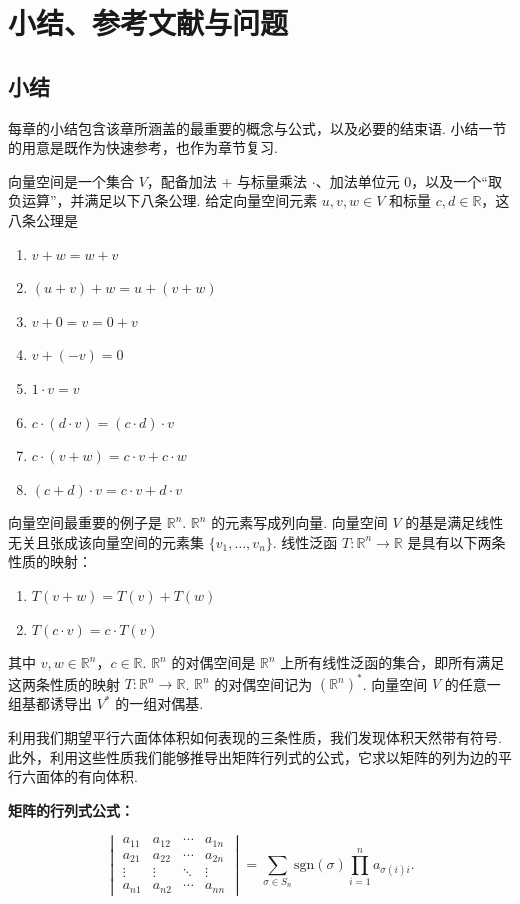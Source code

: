 \section{小结、参考文献与问题}

\subsection{小结}

每章的小结包含该章所涵盖的最重要的概念与公式，以及必要的结束语. 小结一节的用意是既作为快速参考，也作为章节复习.

向量空间是一个集合 $V$，配备加法 $+$ 与标量乘法 $\cdot$、加法单位元 $0$，以及一个``取负运算''，并满足以下八条公理. 给定向量空间元素 $u,v,w\in V$ 和标量 $c,d\in\mathbb{R}$，这八条公理是
\begin{enumerate}
  \item $v+w=w+v$
  \item $(u+v)+w=u+(v+w)$
  \item $v+0=v=0+v$
  \item $v+(-v)=0$
  \item $1\cdot v=v$
  \item $c\cdot(d\cdot v)=(c\cdot d)\cdot v$
  \item $c\cdot(v+w)=c\cdot v+c\cdot w$
  \item $(c+d)\cdot v=c\cdot v+d\cdot v
  $
\end{enumerate}
向量空间最重要的例子是 $\mathbb{R}^n$. $\mathbb{R}^n$ 的元素写成列向量. 向量空间 $V$ 的基是满足线性无关且张成该向量空间的元素集 $\{v_1,\ldots,v_n\}$. 线性泛函 $T:\mathbb{R}^n\to\mathbb{R}$ 是具有以下两条性质的映射：
\begin{enumerate}
  \item $T(v+w)=T(v)+T(w)$
  \item $T(c\cdot v)=c\cdot T(v)$
\end{enumerate}
其中 $v,w\in\mathbb{R}^n$，$c\in\mathbb{R}$. $\mathbb{R}^n$ 的对偶空间是 $\mathbb{R}^n$ 上所有线性泛函的集合，即所有满足这两条性质的映射 $T:\mathbb{R}^n\to\mathbb{R}$. $\mathbb{R}^n$ 的对偶空间记为 $(\mathbb{R}^n)^*$. 向量空间 $V$ 的任意一组基都诱导出 $V^*$ 的一组对偶基.

利用我们期望平行六面体体积如何表现的三条性质，我们发现体积天然带有符号. 此外，利用这些性质我们能够推导出矩阵行列式的公式，它求以矩阵的列为边的平行六面体的有向体积.

\begin{center}
\textbf{矩阵的行列式公式：}
\end{center}
\[
\begin{vmatrix}a_{11}&a_{12}&\cdots&a_{1n}\\a_{21}&a_{22}&\cdots&a_{2n}\\\vdots&\vdots&\ddots&\vdots\\a_{n1}&a_{n2}&\cdots&a_{nn}\end{vmatrix}
=\sum_{\sigma\in S_n}\mathrm{sgn}(\sigma)\prod_{i=1}^{n}a_{\sigma(i)i}.
\]

